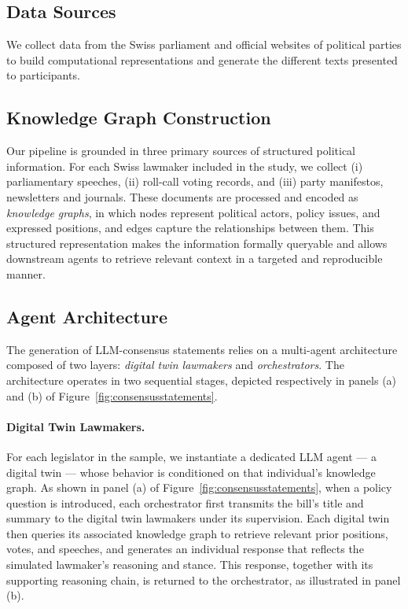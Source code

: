 \documentclass[11pt]{article}
\begin{document}
\subsection{Data Sources}

We collect data from the Swiss parliament and official websites of political parties to build computational representations and generate the different texts presented to participants.


\subsection{Knowledge Graph Construction}

Our pipeline is grounded in three primary sources of structured political information. For each Swiss lawmaker included in the study, we collect (i) parliamentary speeches, (ii) roll-call voting records, and (iii) party manifestos, newsletters and journals. These documents are processed and encoded as \textit{knowledge graphs}, in which nodes represent political actors, policy issues, and expressed positions, and edges capture the relationships between them. This structured representation makes the information formally queryable and allows downstream agents to retrieve relevant context in a targeted and reproducible manner.


\subsection{Agent Architecture}

The generation of LLM-consensus statements relies on a multi-agent architecture composed of two layers: \textit{digital twin lawmakers} and \textit{orchestrators}. The architecture operates in two sequential stages, depicted respectively in panels (a) and (b) of Figure~\ref{fig:consensusstatements}.

\paragraph{Digital Twin Lawmakers.} For each legislator in the sample, we instantiate a dedicated LLM agent — a digital twin — whose behavior is conditioned on that individual's knowledge graph. As shown in panel (a) of Figure~\ref{fig:consensusstatements}, when a policy question is introduced, each orchestrator first transmits the bill's title and summary to the digital twin lawmakers under its supervision. Each digital twin then queries its associated knowledge graph to retrieve relevant prior positions, votes, and speeches, and generates an individual response that reflects the simulated lawmaker's reasoning and stance. This response, together with its supporting reasoning chain, is returned to the orchestrator, as illustrated in panel (b).
\end{document}
